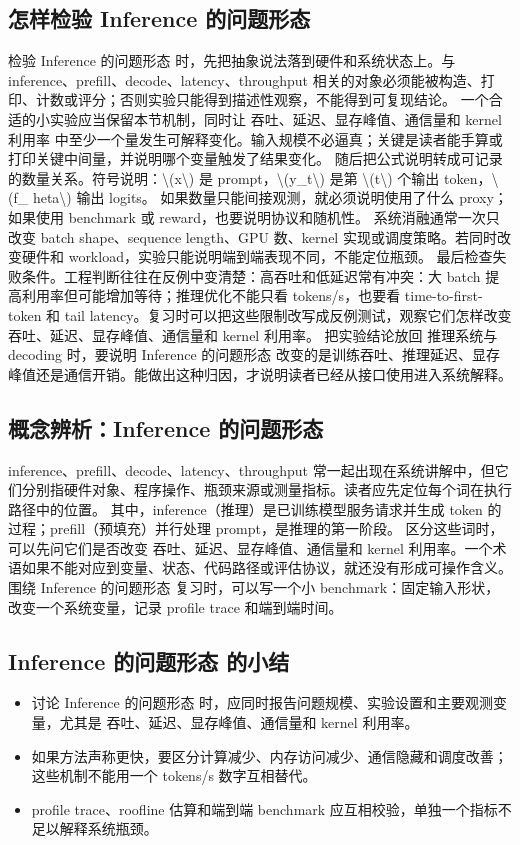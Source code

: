 \documentclass[a4paper]{article}
\begin{document}
\subsection{怎样检验 Inference 的问题形态}
检验 Inference 的问题形态 时，先把抽象说法落到硬件和系统状态上。与 inference、prefill、decode、latency、throughput 相关的对象必须能被构造、打印、计数或评分；否则实验只能得到描述性观察，不能得到可复现结论。
一个合适的小实验应当保留本节机制，同时让 吞吐、延迟、显存峰值、通信量和 kernel 利用率 中至少一个量发生可解释变化。输入规模不必逼真；关键是读者能手算或打印关键中间量，并说明哪个变量触发了结果变化。
随后把公式说明转成可记录的数量关系。符号说明：\textbackslash{}(x\textbackslash{}) 是 prompt，\textbackslash{}(y\_t\textbackslash{}) 是第 \textbackslash{}(t\textbackslash{}) 个输出 token，\textbackslash{}(f\_ heta\textbackslash{}) 输出 logits。 如果数量只能间接观测，就必须说明使用了什么 proxy；如果使用 benchmark 或 reward，也要说明协议和随机性。
系统消融通常一次只改变 batch shape、sequence length、GPU 数、kernel 实现或调度策略。若同时改变硬件和 workload，实验只能说明端到端表现不同，不能定位瓶颈。
最后检查失败条件。工程判断往往在反例中变清楚：高吞吐和低延迟常有冲突：大 batch 提高利用率但可能增加等待；推理优化不能只看 tokens/s，也要看 time-to-first-token 和 tail latency。复习时可以把这些限制改写成反例测试，观察它们怎样改变 吞吐、延迟、显存峰值、通信量和 kernel 利用率。
把实验结论放回 推理系统与 decoding 时，要说明 Inference 的问题形态 改变的是训练吞吐、推理延迟、显存峰值还是通信开销。能做出这种归因，才说明读者已经从接口使用进入系统解释。
\subsection{概念辨析：Inference 的问题形态}
inference、prefill、decode、latency、throughput 常一起出现在系统讲解中，但它们分别指硬件对象、程序操作、瓶颈来源或测量指标。读者应先定位每个词在执行路径中的位置。
其中，inference（推理）是已训练模型服务请求并生成 token 的过程；prefill（预填充）并行处理 prompt，是推理的第一阶段。
区分这些词时，可以先问它们是否改变 吞吐、延迟、显存峰值、通信量和 kernel 利用率。一个术语如果不能对应到变量、状态、代码路径或评估协议，就还没有形成可操作含义。
围绕 Inference 的问题形态 复习时，可以写一个小 benchmark：固定输入形状，改变一个系统变量，记录 profile trace 和端到端时间。
\subsection{Inference 的问题形态 的小结}
\begin{itemize}
\item 讨论 Inference 的问题形态 时，应同时报告问题规模、实验设置和主要观测变量，尤其是 吞吐、延迟、显存峰值、通信量和 kernel 利用率。
\item 如果方法声称更快，要区分计算减少、内存访问减少、通信隐藏和调度改善；这些机制不能用一个 tokens/s 数字互相替代。
\item profile trace、roofline 估算和端到端 benchmark 应互相校验，单独一个指标不足以解释系统瓶颈。
\end{itemize}
\end{document}
